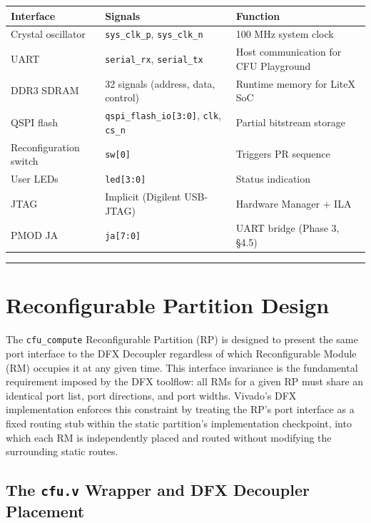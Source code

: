 \begin{table}[htbp]
\centering
\begin{tabular}{lll}
\toprule
Interface & Signals & Function \\
\midrule
Crystal oscillator & \texttt{sys\_clk\_p}, \texttt{sys\_clk\_n} & 100 MHz system clock \\
UART & \texttt{serial\_rx}, \texttt{serial\_tx} & Host communication for CFU Playground \\
DDR3 SDRAM & 32 signals (address, data, control) & Runtime memory for LiteX SoC \\
QSPI flash & \texttt{qspi\_flash\_io[3:0]}, \texttt{clk}, \texttt{cs\_n} & Partial bitstream storage \\
Reconfiguration switch & \texttt{sw[0]} & Triggers PR sequence \\
User LEDs & \texttt{led[3:0]} & Status indication \\
JTAG & Implicit (Digilent USB-JTAG) & Hardware Manager + ILA \\
PMOD JA & \texttt{ja[7:0]} & UART bridge (Phase 3, §4.5) \\
\bottomrule
\end{tabular}
\end{table}

\vspace{0.4em}\hrule\vspace{0.4em}

\section{Reconfigurable Partition Design}

The \texttt{cfu\_compute} Reconfigurable Partition (RP) is designed to present the same port interface to the DFX Decoupler regardless of which Reconfigurable Module (RM) occupies it at any given time. This interface invariance is the fundamental requirement imposed by the DFX toolflow: all RMs for a given RP must share an identical port list, port directions, and port widths. Vivado's DFX implementation enforces this constraint by treating the RP's port interface as a fixed routing stub within the static partition's implementation checkpoint, into which each RM is independently placed and routed without modifying the surrounding static routes.

\subsection{The \texttt{cfu.v} Wrapper and DFX Decoupler Placement}

